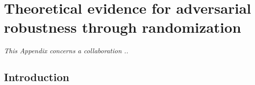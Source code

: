 \chapter{Theoretical evidence for adversarial robustness through randomization}
\label{chapter:theoretical_evidence_for_adversarial_robustness_through_randomization}
\localtableofcontents

\emph{This Appendix concerns a collaboration ..}


%

\section{Introduction}
\label{section:ap3-introduction}

